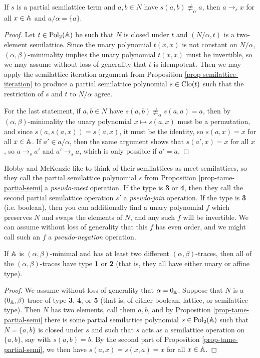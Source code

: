 \begin{appendices}
\begin{prop}
If $s$ is a partial semilattice term and $a,b \in N$ have $s(a,b) \not\equiv_\alpha a$, then $a \rightarrow_s x$ for all $x \in \mathbb{A}$ and $a/\alpha = \{a\}$.
\end{prop}
\begin{proof} Let $t \in \operatorname{Pol}_2(\mathbb{A})$ be such that $N$ is closed under $t$ and $(N/\alpha, t)$ is a two-element semilattice. Since the unary polynomial $t(x,x)$ is not constant on $N/\alpha$, $(\alpha,\beta)$-minimality implies the unary polynomial $t(x,x)$ must be invertible, so we may assume without loss of generality that $t$ is idempotent. Then we may apply the semilattice iteration argument from Proposition \ref{prop-semilattice-iteration} to produce a partial semilattice polynomial $s \in \operatorname{Clo}(t)$ such that the restriction of $s$ and $t$ to $N/\alpha$ agree.

For the last statement, if $a,b \in N$ have $s(a,b) \not\equiv_\alpha s(a,a) = a$, then by $(\alpha,\beta)$-minimality the unary polynomial $x \mapsto s(a,x)$ must be a permutation, and since $s(a,s(a,x)) = s(a,x)$, it must be the identity, so $s(a,x) = x$ for all $x \in \mathbb{A}$. If $a' \in a/\alpha$, then the same argument shows that $s(a',x) = x$ for all $x$, so $a \rightarrow_s a'$ and $a' \rightarrow_s a$, which is only possible if $a' = a$.
\end{proof}

Hobby and McKenzie \cite{hobby-mckenzie} like to think of their semilattices as meet-semilattices, so they call the partial semilattice polynomial $s$ from Proposition \ref{prop-tame-partial-semi} a \emph{pseudo-meet} operation. If the type is \textbf{3} or \textbf{4}, then they call the second partial semilattice operation $s'$ a \emph{pseudo-join} operation. If the type is \textbf{3} (i.e. boolean), then you can additionally find a unary polynomial $f$ which preserves $N$ and swaps the elements of $N$, and any such $f$ will be invertible. We can assume without loss of generality that this $f$ has even order, and we might call such an $f$ a \emph{pseudo-negation} operation.

\begin{prop} If $\mathbb{A}$ is $(\alpha,\beta)$-minimal and has at least two different $(\alpha,\beta)$-traces, then all of the $(\alpha,\beta)$-traces have type \textbf{1} or \textbf{2} (that is, they all have either unary or affine type).
\end{prop}
\begin{proof} We assume without loss of generality that $\alpha = 0_{\mathbb{A}}$. Suppose that $N$ is a $(0_{\mathbb{A}},\beta)$-trace of type \textbf{3}, \textbf{4}, or \textbf{5} (that is, of either boolean, lattice, or semilattice type). Then $N$ has two elements, call them $a,b$, and by Proposition \ref{prop-tame-partial-semi} there is some partial semilattice polynomial $s \in \operatorname{Pol}_2(\mathbb{A})$ such that $N = \{a,b\}$ is closed under $s$ and such that $s$ acts as a semilattice operation on $\{a,b\}$, say with $s(a,b) = b$. By the second part of Proposition \ref{prop-tame-partial-semi}, we then have $s(a,x) = s(x,a) = x$ for all $x \in \mathbb{A}$.


\end{proof}
\end{appendices}
